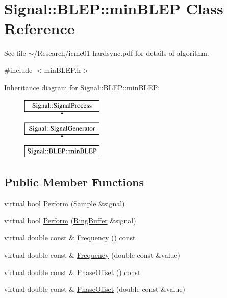 \hypertarget{classSignal_1_1BLEP_1_1minBLEP}{\section{Signal\+:\+:B\+L\+E\+P\+:\+:min\+B\+L\+E\+P Class Reference}
\label{classSignal_1_1BLEP_1_1minBLEP}
}


See file $\sim$/\+Research/icmc01-\/hardsync.pdf for details of algorithm.  




{\ttfamily \#include $<$min\+B\+L\+E\+P.\+h$>$}

Inheritance diagram for Signal\+:\+:B\+L\+E\+P\+:\+:min\+B\+L\+E\+P\+:\begin{figure}[H]
\begin{center}
\leavevmode
\includegraphics[height=3.000000cm]{classSignal_1_1BLEP_1_1minBLEP}
\end{center}
\end{figure}
\subsection*{Public Member Functions}
\begin{DoxyCompactItemize}
\item 
virtual bool \hyperlink{classSignal_1_1SignalGenerator_a2cd9061c5ae40a392a9476551b4379f3}{Perform} (\hyperlink{classSignal_1_1Sample}{Sample} \&signal)
\item 
virtual bool \hyperlink{classSignal_1_1SignalGenerator_a126d52dd9b6b14d33efc624e2c89284e}{Perform} (\hyperlink{classSignal_1_1RingBuffer}{Ring\+Buffer} \&signal)
\item 
virtual double const \& \hyperlink{classSignal_1_1SignalGenerator_a96af42ee68f94e9b04d034fd68b73ecd}{Frequency} () const 
\item 
virtual double const \& \hyperlink{classSignal_1_1SignalGenerator_af83b532bf3ddc3637c2fd7a1dfd095cb}{Frequency} (double const \&value)
\item 
virtual double const \& \hyperlink{classSignal_1_1SignalGenerator_ac2538ec946f001e394d2416fda698d1c}{Phase\+Offset} () const 
\item 
virtual double const \& \hyperlink{classSignal_1_1SignalGenerator_ac6a103ff72beaa338f6d18c812522d78}{Phase\+Offset} (double const \&value)
\end{DoxyCompactItemize}
